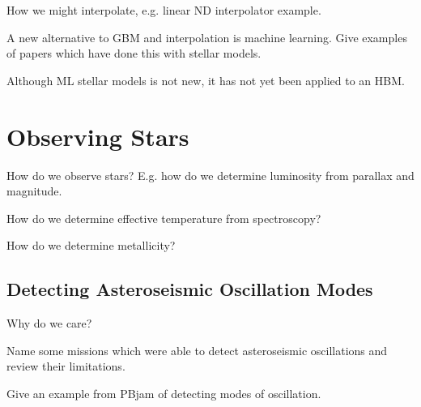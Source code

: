 How we might interpolate, e.g. linear ND interpolator example.

A new alternative to GBM and interpolation is machine learning. Give examples of papers which have done this with stellar models.

Although ML stellar models is not new, it has not yet been applied to an HBM. 

\section{Observing Stars}

How do we observe stars? E.g. how do we determine luminosity from parallax and magnitude.

How do we determine effective temperature from spectroscopy?

How do we determine metallicity?

\subsection{Detecting Asteroseismic Oscillation Modes}

Why do we care?

Name some missions which were able to detect asteroseismic oscillations and review their limitations.

Give an example from PBjam of detecting modes of oscillation.
